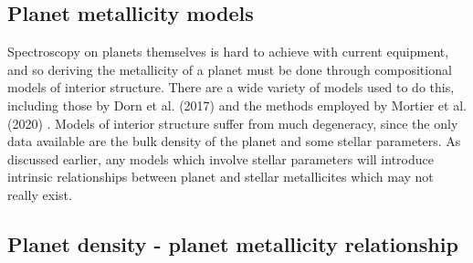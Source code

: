 \documentclass[a4paper,twocolumn,12pt]{article}
\begin{document}

\subsection{Planet metallicity models}
\label{subsection: Planet Metallicity Models}
\vspace{-0.3em}
Spectroscopy on planets themselves is hard to achieve with current equipment, and so deriving the metallicity of a planet must be done through compositional models of interior structure. There are a wide variety of models used to do this, including those by Dorn et al. (2017) \cite{SussyInteriorModelsSuper-EarthsAndSub-Neptunes} and the methods employed by Mortier et al. (2020) \cite{MortierInteriorStructure}. Models of interior structure suffer from much degeneracy, since the only data available are the bulk density of the planet and some stellar parameters. As discussed earlier, any models which involve stellar parameters will introduce intrinsic relationships between planet and stellar metallicites which may not really exist.

\subsection{Planet density - planet metallicity relationship}

\end{document}
